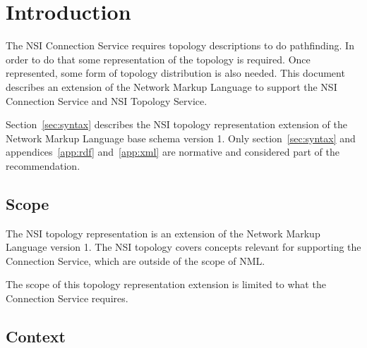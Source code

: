 \documentclass[12pt]{article}  %
\begin{document}
\tableofcontents

\newcommand{\qq}{\symbol{34}} %
\newcommand{\q}{\symbol{39}} %
\newcommand{\underscore}{\symbol{95}} %

\newcommand{\MUST}{\textsc{must}}
\newcommand{\MUSTNOT}{\textsc{must not}}
\newcommand{\REQUIRED}{\textsc{required}}
\newcommand{\SHALL}{\textsc{shall}}
\newcommand{\SHALLNOT}{\textsc{shall not}}
\newcommand{\SHOULD}{\textsc{should}}
\newcommand{\SHOULDNOT}{\textsc{should not}}
\newcommand{\RECOMMENDED}{\textsc{recommended}}
\newcommand{\MAY}{\textsc{may}}
\newcommand{\OPTIONAL}{\textsc{optional}}

\newpage

\section{Introduction}


 The NSI Connection Service requires topology descriptions to do 
pathfinding. In order to do that some representation of the topology is required. 
Once represented, some form of topology distribution is also needed. This document 
describes an extension of the Network Markup Language\cite{nml} to support the NSI Connection Service\cite{nsi-cs} and NSI Topology Service\cite{nsi-ts}.

Section~\ref{sec:syntax} describes the NSI topology representation extension of the Network Markup Language base schema version 1. Only section~\ref{sec:syntax} and appendices~\ref{app:rdf} and~\ref{app:xml} are normative and considered part of the recommendation.

\subsection{Scope}

The NSI topology representation is an extension of the Network Markup Language version 1. The NSI topology covers concepts relevant for supporting the Connection Service, which are outside of the scope of NML.

The scope of this topology representation extension is limited to what the Connection Service requires.

\subsection{Context} %
\label{sub:context}
\end{document}
